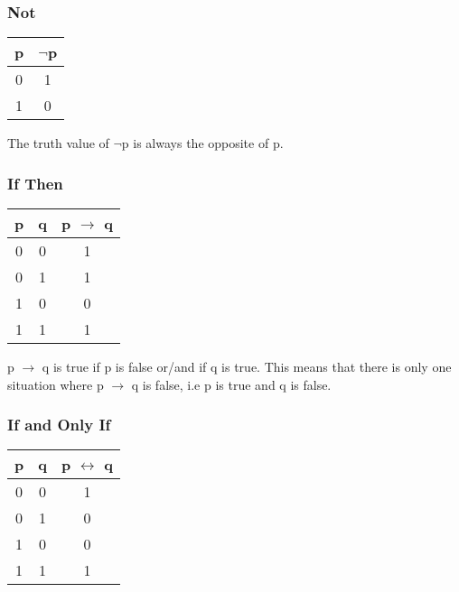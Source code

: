 \documentclass{report}
\begin{document}
\subsubsection{Not}

\begin{center}
  \begin{tabular}{| c | c |}
    \hline
    p & $\neg$p \\ \hline
    0 & 1 \\
    1 & 0 \\ \hline
  \end{tabular}
\end{center}

The truth value of $\neg$p is always the opposite of p.

\subsubsection{If Then}

\begin{center}
  \begin{tabular}{| c | c | c |}
    \hline
    p & q & p $\to$ q \\ \hline
    0 & 0 & 1 \\
    0 & 1 & 1 \\
    1 & 0 & 0 \\
    1 & 1 & 1 \\ \hline
  \end{tabular}
\end{center}

p $\to$ q is true if p is false or/and if q is true. This means that there is
only one situation where p $\to$ q is false, i.e p is true and q is false. 

\subsubsection{If and Only If}

\begin{center}
  \begin{tabular}{| c | c | c |}
    \hline
    p & q & p $\leftrightarrow$ q \\ \hline
    0 & 0 & 1 \\
    0 & 1 & 0 \\
    1 & 0 & 0 \\
    1 & 1 & 1 \\ \hline
  \end{tabular}
\end{center}
\end{document}
